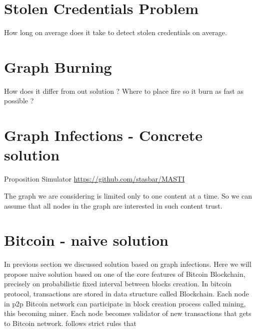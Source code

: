 \documentclass[nostrict]{szablonPG}
\begin{document}
\section{Stolen Credentials Problem}
How long on average does it take to detect stolen credentials on average.

\section{Graph Burning}
How does it differ from out solution ? Where to place fire so it burn as fast as possible ?


\section{Graph Infections - Concrete solution}
Proposition \cite{jekon2019content}
Simulator \url{https://github.com/stasbar/MASTI}

The graph we are considering is limited only to one content at a time. So we can assume that all nodes in the graph are interested in such content trust.

\section{Bitcoin - naive solution}
In previous section we discussed solution based on graph infections. Here we will propose naive solution based on one of the core features of Bitcoin Blockchain, precisely on probabilistic fixed interval between blocks creation. In bitcoin protocol, transactions are stored in data structure called Blockchain. Each node in p2p Bitcoin network can participate in block creation process called mining, this becoming miner. Each node becomes validator of new transactions that gets to Bitcoin network. follows strict rules that 
\end{document}
